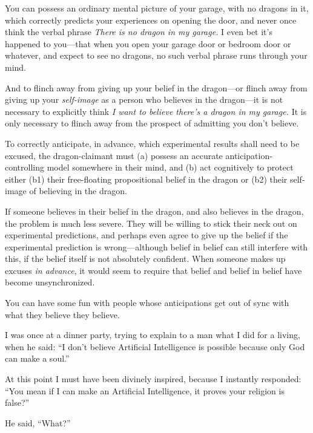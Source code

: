 {
 You can possess an ordinary mental picture of your garage, with no
dragons in it, which correctly predicts your experiences on opening the
door, and never once think the verbal phrase \textit{There is no dragon
in my garage.} I even bet it's happened to you---that
when you open your garage door or bedroom door or whatever, and expect
to see no dragons, no such verbal phrase runs through your mind.}

{
 And to flinch away from giving up your belief in the dragon---or
flinch away from giving up your \textit{self-image} as a person who
believes in the dragon---it is not necessary to explicitly think
\textit{I want to believe there's a dragon in my
garage.} It is only necessary to flinch away from the prospect of
admitting you don't believe.}

{
 To correctly anticipate, in advance, which experimental results
shall need to be excused, the dragon-claimant must (a) possess an
accurate anticipation-controlling model somewhere in their mind, and
(b) act cognitively to protect either (b1) their free-floating
propositional belief in the dragon or (b2) their self-image of
believing in the dragon.}

{
 If someone believes in their belief in the dragon, and also
believes in the dragon, the problem is much less severe. They will be
willing to stick their neck out on experimental predictions, and
perhaps even agree to give up the belief if the experimental prediction
is wrong---although belief in belief can still interfere with this, if
the belief itself is not absolutely confident. When someone makes up
excuses \textit{in advance}, it would seem to require that belief and
belief in belief have become unsynchronized.}

\myendsectiontext


\bigskip


{
 You can have some fun with people whose anticipations get out of
sync with what they believe they believe. }

{
 I was once at a dinner party, trying to explain to a man what I
did for a living, when he said: ``I
don't believe Artificial Intelligence is possible
because only God can make a soul.''}

{
 At this point I must have been divinely inspired, because I
instantly responded: ``You mean if I can make an
Artificial Intelligence, it proves your religion is
false?''}

{
 He said, ``What?''}


